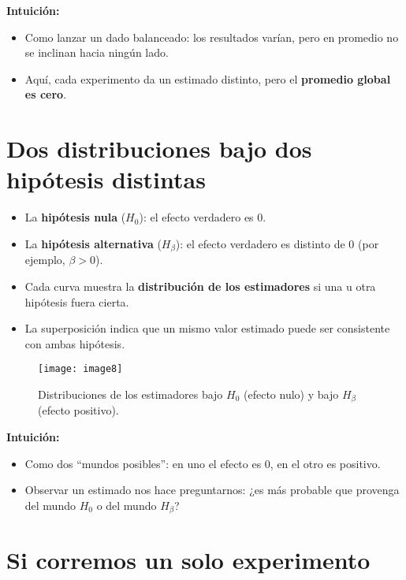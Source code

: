 \documentclass[12pt]{article}
\begin{document}
\textbf{Intuición:}
\begin{itemize}
    \item Como lanzar un dado balanceado: los resultados varían, pero en promedio no se inclinan hacia ningún lado.
    \item Aquí, cada experimento da un estimado distinto, pero el \textbf{promedio global es cero}.
\end{itemize}

\section*{\noindent\textbf{Dos distribuciones bajo dos hipótesis distintas}}

\begin{itemize}
    \item La \textbf{hipótesis nula} ($H_0$): el efecto verdadero es 0.  
    \item La \textbf{hipótesis alternativa} ($H_\beta$): el efecto verdadero es distinto de 0 (por ejemplo, $\beta > 0$).  
    \item Cada curva muestra la \textbf{distribución de los estimadores} si una u otra hipótesis fuera cierta.  
    \item La superposición indica que un mismo valor estimado puede ser consistente con ambas hipótesis.
\end{itemize}

\begin{figure}[H]
\centering
\texttt{[image: image8]}
\caption{\footnotesize Distribuciones de los estimadores bajo $H_0$ (efecto nulo) y bajo $H_\beta$ (efecto positivo).}
\end{figure}

\textbf{Intuición:}
\begin{itemize}
    \item Como dos “mundos posibles”: en uno el efecto es 0, en el otro es positivo.  
    \item Observar un estimado nos hace preguntarnos: ¿es más probable que provenga del mundo $H_0$ o del mundo $H_\beta$?
\end{itemize}

\section*{\noindent\textbf{Si corremos un solo experimento}}
\end{document}

